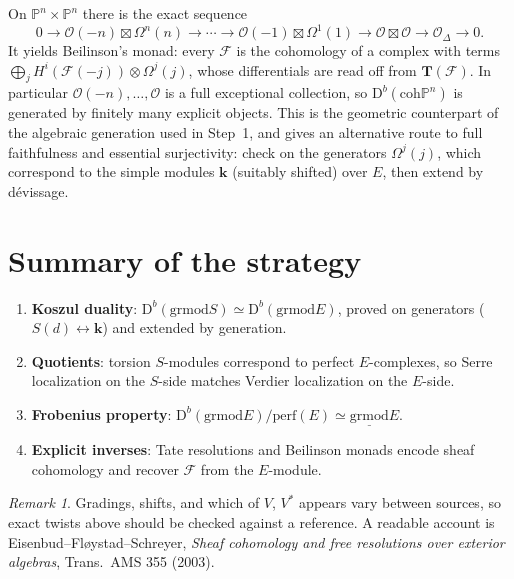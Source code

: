 \documentclass[11pt]{article}
\theoremstyle{remark}
\newtheorem{remark}[theorem]{Remark}
\newcommand{\PP}{\mathbb{P}}
\newcommand{\Dcal}{\mathrm{D}}
\newcommand{\coh}{\mathrm{coh}}
\newcommand{\grmod}{\mathrm{grmod}}
\newcommand{\stgrmod}{\underline{\mathrm{grmod}}}
\newcommand{\perf}{\mathrm{perf}}
\renewcommand{\k}{\mathbf{k}}
\begin{document}
On $\PP^n\times\PP^n$ there is the exact sequence
\[
0\to \mathcal O(-n)\boxtimes\Omega^n(n)\to\cdots\to\mathcal O(-1)\boxtimes\Omega^1(1)\to \mathcal O\boxtimes\mathcal O\to\mathcal O_\Delta\to0 .
\]
It yields Beilinson's monad: every $\mathcal F$ is the cohomology of a complex with terms $\bigoplus_j H^i(\mathcal F(-j))\otimes\Omega^j(j)$, whose differentials are read off from $\mathbf T(\mathcal F)$. In particular $\mathcal O(-n),\dots,\mathcal O$ is a full exceptional collection, so $\Dcal^b(\coh\PP^n)$ is generated by finitely many explicit objects. This is the geometric counterpart of the algebraic generation used in Step~1, and gives an alternative route to full faithfulness and essential surjectivity: check on the generators $\Omega^j(j)$, which correspond to the simple modules $\k$ (suitably shifted) over $E$, then extend by d\'evissage.

\section{Summary of the strategy}

\begin{enumerate}
\item \textbf{Koszul duality}: $\Dcal^b(\grmod S)\simeq\Dcal^b(\grmod E)$, proved on generators ($S(d)\leftrightarrow\k$) and extended by generation.
\item \textbf{Quotients}: torsion $S$-modules correspond to perfect $E$-complexes, so Serre localization on the $S$-side matches Verdier localization on the $E$-side.
\item \textbf{Frobenius property}: $\Dcal^b(\grmod E)/\perf(E)\simeq\stgrmod E$.
\item \textbf{Explicit inverses}: Tate resolutions and Beilinson monads encode sheaf cohomology and recover $\mathcal F$ from the $E$-module.
\end{enumerate}

\begin{remark}
Gradings, shifts, and which of $V$, $V^*$ appears vary between sources, so exact twists above should be checked against a reference. A readable account is Eisenbud--Fl{\o}ystad--Schreyer, \emph{Sheaf cohomology and free resolutions over exterior algebras}, Trans.\ AMS 355 (2003).
\end{remark}
\end{document}
